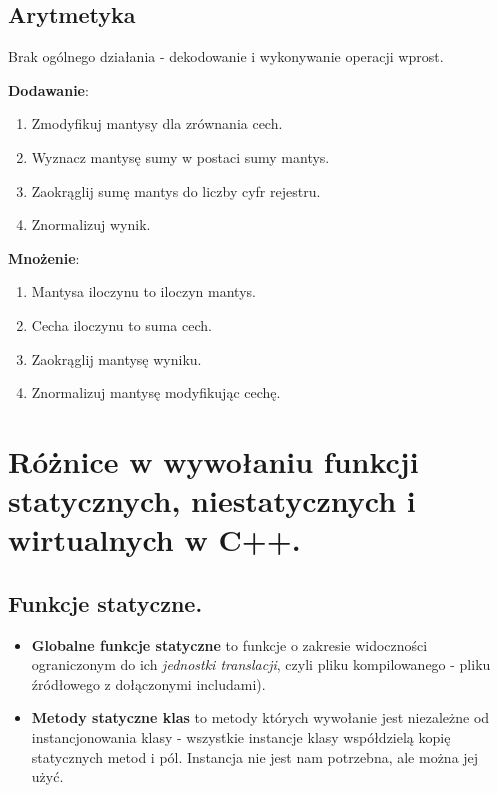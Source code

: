 \documentclass[main.tex]{subfiles}
\begin{document}
    \subsection{Arytmetyka}
    Brak ogólnego działania - dekodowanie i wykonywanie operacji wprost.

    \noindent \textbf{Dodawanie}:
    \begin{enumerate}[noitemsep]
        \item Zmodyfikuj mantysy dla zrównania cech.
        \item Wyznacz mantysę sumy w postaci sumy mantys.
        \item Zaokrąglij sumę mantys do liczby cyfr rejestru.
        \item Znormalizuj wynik.
    \end{enumerate}

    \noindent \textbf{Mnożenie}:
    \begin{enumerate}[noitemsep]
        \item Mantysa iloczynu to iloczyn mantys.
        \item Cecha iloczynu to suma cech.
        \item Zaokrąglij mantysę wyniku.
        \item Znormalizuj mantysę modyfikując cechę.
    \end{enumerate}


    \section{Różnice w wywołaniu funkcji statycznych, niestatycznych i wirtualnych w C++.}

    \subsection{Funkcje statyczne.}
    \begin{itemize}
        \item \textbf{Globalne funkcje statyczne} to funkcje o zakresie widoczności ograniczonym do
        ich \textit{jednostki translacji}, czyli pliku kompilowanego - pliku źródłowego z dołączonymi includami).
        \item \textbf{Metody statyczne klas} to metody których wywołanie jest niezależne od instancjonowania klasy -
        wszystkie instancje klasy współdzielą kopię statycznych metod i pól. Instancja nie jest nam potrzebna, ale
        można jej użyć.
    \end{itemize}
\end{document}
